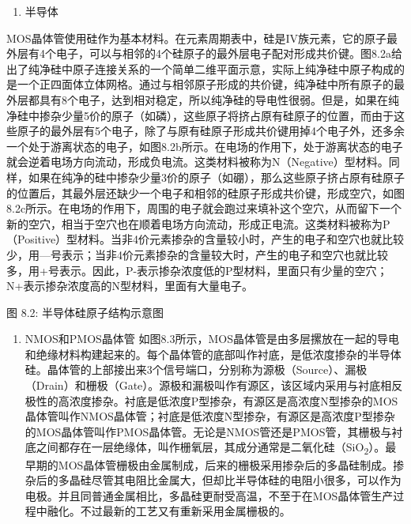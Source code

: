 \documentclass[]{ctexbook}
\providecommand{\tightlist}{%
  \setlength{\itemsep}{0pt}\setlength{\parskip}{0pt}}
\begin{document}
\begin{enumerate}
\def\labelenumi{\arabic{enumi}.}
\tightlist
\item
  半导体
\end{enumerate}

MOS晶体管使用硅作为基本材料。在元素周期表中，硅是IV族元素，它的原子最外层有4个电子，可以与相邻的4个硅原子的最外层电子配对形成共价键。图8.2a给出了纯净硅中原子连接关系的一个简单二维平面示意，实际上纯净硅中原子构成的是一个正四面体立体网格。通过与相邻原子形成的共价键，纯净硅中所有原子的最外层都具有8个电子，达到相对稳定，所以纯净硅的导电性很弱。但是，如果在纯净硅中掺杂少量5价的原子（如磷），这些原子将挤占原有硅原子的位置，而由于这些原子的最外层有5个电子，除了与原有硅原子形成共价键用掉4个电子外，还多余一个处于游离状态的电子，如图8.2b所示。在电场的作用下，处于游离状态的电子就会逆着电场方向流动，形成负电流。这类材料被称为N（Negative）型材料。同样，如果在纯净的硅中掺杂少量3价的原子（如硼），那么这些原子挤占原有硅原子的位置后，其最外层还缺少一个电子和相邻的硅原子形成共价键，形成空穴，如图8.2c所示。在电场的作用下，周围的电子就会跑过来填补这个空穴，从而留下一个新的空穴，相当于空穴也在顺着电场方向流动，形成正电流。这类材料被称为P（Positive）型材料。当非4价元素掺杂的含量较小时，产生的电子和空穴也就比较少，用---号表示；当非4价元素掺杂的含量较大时，产生的电子和空穴也就比较多，用+号表示。因此，P-表示掺杂浓度低的P型材料，里面只有少量的空穴；N+表示掺杂浓度高的N型材料，里面有大量电子。

图 8.2: 半导体硅原子结构示意图

\begin{enumerate}
\def\labelenumi{\arabic{enumi}.}
\setcounter{enumi}{1}
\tightlist
\item
  NMOS和PMOS晶体管
  如图8.3所示，MOS晶体管是由多层摞放在一起的导电和绝缘材料构建起来的。每个晶体管的底部叫作衬底，是低浓度掺杂的半导体硅。晶体管的上部接出来3个信号端口，分别称为源极（Source）、漏极（Drain）和栅极（Gate）。源极和漏极叫作有源区，该区域内采用与衬底相反极性的高浓度掺杂。衬底是低浓度P型掺杂，有源区是高浓度N型掺杂的MOS晶体管叫作NMOS晶体管；衬底是低浓度N型掺杂，有源区是高浓度P型掺杂的MOS晶体管叫作PMOS晶体管。无论是NMOS管还是PMOS管，其栅极与衬底之间都存在一层绝缘体，叫作栅氧层，其成分通常是二氧化硅（SiO\textsubscript{2}）。最早期的MOS晶体管栅极由金属制成，后来的栅极采用掺杂后的多晶硅制成。掺杂后的多晶硅尽管其电阻比金属大，但却比半导体硅的电阻小很多，可以作为电极。并且同普通金属相比，多晶硅更耐受高温，不至于在MOS晶体管生产过程中融化。不过最新的工艺又有重新采用金属栅极的。
\end{enumerate}
\end{document}
